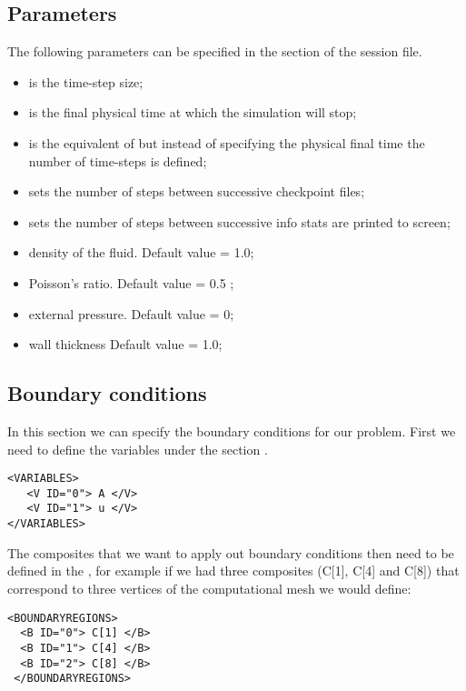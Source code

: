  \subsection{Parameters}
The following parameters can be specified in the  section of
the session file. 
\begin{itemize}
\item {} is the time-step size;
\item {} is the final physical time at which the simulation will  stop;
\item {} is the equivalent of  but instead of specifying the 
physical final time the number of time-steps is defined;
\item {} sets the number of steps between successive checkpoint files;
\item {} sets the number of steps between successive info stats are printed 
to screen;
\item {} density of the fluid. Default value = 1.0;
\item {} Poisson's ratio. Default value = 0.5 ;
\item {} external pressure. Default value = 0;
\item {} wall thickness Default value = 1.0;
\end{itemize}

\subsection{Boundary conditions}
In this section we can specify the boundary conditions for our problem.
First we need to define the variables under the section .
\begin{lstlisting}[style=XmlStyle]        
<VARIABLES>
   <V ID="0"> A </V>
   <V ID="1"> u </V>
</VARIABLES>
\end{lstlisting}

The composites that we want to apply out boundary conditions then need to be defined in the , for example if we had three composites (C[1], C[4] and C[8]) that correspond to three vertices of the computational mesh we would define:
\begin{lstlisting}[style=XmlStyle]        
<BOUNDARYREGIONS>
  <B ID="0"> C[1] </B>
  <B ID="1"> C[4] </B>
  <B ID="2"> C[8] </B>
 </BOUNDARYREGIONS>
\end{lstlisting}


